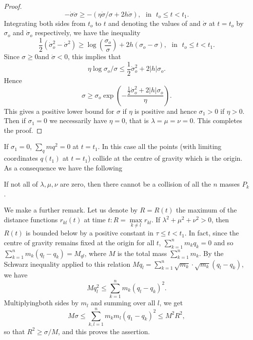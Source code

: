 \begin{proof}
$$
-\dot{\sigma} \ddot{\sigma} \geq - (\eta \dot{\sigma}/ \sigma + 2h \dot{\sigma}), \text{~ in ~} t_o \leq t < t_1. 
$$
Integrating both sides from $t_o$ to $t$ and denoting the values of and $\dot{\sigma}$ at $t = t_o$ by $\sigma_o$ and $\dot{\sigma}_o$ respectively, we have the inequality
$$
\frac{1}{2} (\dot{\sigma}^2_o - \dot{\sigma}^2) \geq \log \left(\frac{\sigma_o}{\sigma} \right) + 2h (\sigma_o - \sigma), \text{~ in ~} t_o \leq t < t_1.
$$
Since $\sigma \geq 0$\pageoriginale and $\dot{\sigma} <0$, this implies that 
$$
\eta \log \sigma_o / \sigma \leq \frac{1}{2} \dot{\sigma}^2_o + 2 |h|\sigma_o.
$$
Hence
\begin{equation*}
\sigma \geq \sigma_o \exp \left(-\frac{\frac{1}{2} \dot{\sigma}^2_o + 2 |h| \sigma_o}{\eta} \right) . \tag{2.2.5}\label{chap2:eq2.2.5} 
\end{equation*}
This gives a positive lower bound for $\sigma$ if $\eta$ is positive and hence $\sigma_1 >0$ if $\eta >0$. Then if $\sigma_1 =0$ we necessarily have $\eta=0$, that is $\lambda = \mu = \nu=0$. This completes the proof.
\end{proof}

If $\sigma_1 = 0$, $\sum\limits_q m q^2 = 0 $ at $t = t_1$. In this case all the points (with limiting coordinates $q(t_1)$ at $t = t_1$) collide at the centre of gravity which is the origin. As a consequence we have the following

\begin{coro*}
If not all of $\lambda, \mu, \nu$ are zero, then there cannot be a collision of all the $n$ masses $P_k$.
\end{coro*}

We make a further remark. Let us denote by $R = R(t)$ the maximum of the distance functions $r_{kl}(t)$ at time $t: R = \max\limits_{k \neq l} r_{kl}$. If $\lambda^2 + \mu^2 + \nu^2 > 0$, then $R(t)$ is bounded below by a positive constant in $\tau \leq t < t_1$. In fact, since the centre of gravity remains fixed at the origin for all $t$, $\sum\limits^n_{k=1} m_k q_k =0$ and so $\sum\limits^n_{k=1} m_k (q_l - q_k) = M_{ql}$, where $M$ is the total mass $\sum\limits^n_{k=1} m_k$. By the Schwarz inequality applied to this relation $Mq_l = \sum\limits^n_{k=1} \sqrt{m_k} \cdot \sqrt{m_k} (q_l - q_k)$, we have
$$
Mq^2_l \leq \sum\limits^n_{k=1} m_k (q_l - q_k)^2. 
$$
Multiplying\pageoriginale both sides by $m_l$ and summing over all $l$, we get
$$
M \sigma \leq \sum^n_{k,l=1} m_k m_l (q_1 - q_k)^2 \leq M^2 R^2, 
$$
so that $R^2 \geq \sigma /M$, and this proves the assertion.

